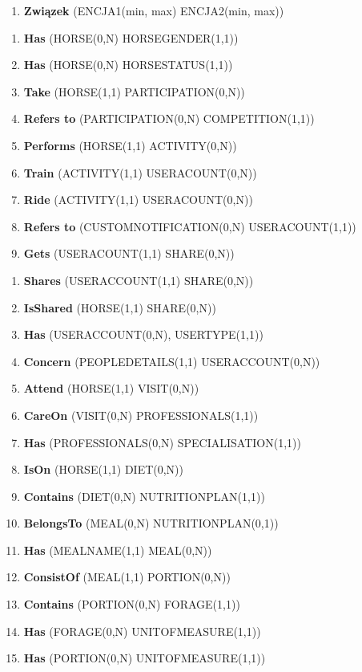 \documentclass[12pt,twoside]{report}
\begin{document}
	\begin{enumerate}[start=0,label={\bfseries ZWI$\backslash$xx}]
		\item \textbf{Związek} (ENCJA1(min, max) ENCJA2(min, max))
	\end{enumerate}
	\begin{enumerate}[start=1,label={\bfseries ZWI$\backslash$0\arabic*}]
		\item \textbf{Has} (HORSE(0,N) HORSEGENDER(1,1))
		\item \textbf{Has} (HORSE(0,N) HORSESTATUS(1,1))
		\item \textbf{Take} (HORSE(1,1) PARTICIPATION(0,N))
		\item \textbf{Refers to} (PARTICIPATION(0,N) COMPETITION(1,1))
		\item \textbf{Performs} (HORSE(1,1) ACTIVITY(0,N))
		\item \textbf{Train} (ACTIVITY(1,1) USERACOUNT(0,N))		
		\item \textbf{Ride} (ACTIVITY(1,1) USERACOUNT(0,N))
		\item \textbf{Refers to} (CUSTOMNOTIFICATION(0,N) USERACOUNT(1,1))
		\item \textbf{Gets} (USERACOUNT(1,1) SHARE(0,N))
	\end{enumerate}
\begin{enumerate}[start=10,label={\bfseries ZWI$\backslash$\arabic*}]	
		\item \textbf{Shares} (USERACCOUNT(1,1) SHARE(0,N))
		\item \textbf{IsShared} (HORSE(1,1) SHARE(0,N))
		\item \textbf{Has} (USERACCOUNT(0,N), USERTYPE(1,1))
		\item \textbf{Concern} (PEOPLEDETAILS(1,1) USERACCOUNT(0,N))
		\item \textbf{Attend} (HORSE(1,1) VISIT(0,N))
		\item \textbf{CareOn} (VISIT(0,N) PROFESSIONALS(1,1))
		\item \textbf{Has} (PROFESSIONALS(0,N) SPECIALISATION(1,1))
		\item \textbf{IsOn} (HORSE(1,1) DIET(0,N))
		\item \textbf{Contains} (DIET(0,N) NUTRITIONPLAN(1,1))
		\item \textbf{BelongsTo} (MEAL(0,N) NUTRITIONPLAN(0,1))
		\item \textbf{Has} (MEALNAME(1,1) MEAL(0,N))		
		\item \textbf{ConsistOf} (MEAL(1,1) PORTION(0,N))
		\item \textbf{Contains} (PORTION(0,N) FORAGE(1,1))
		\item \textbf{Has} (FORAGE(0,N) UNITOFMEASURE(1,1))
		\item \textbf{Has} (PORTION(0,N) UNITOFMEASURE(1,1))
	\end{enumerate}
\end{document}
